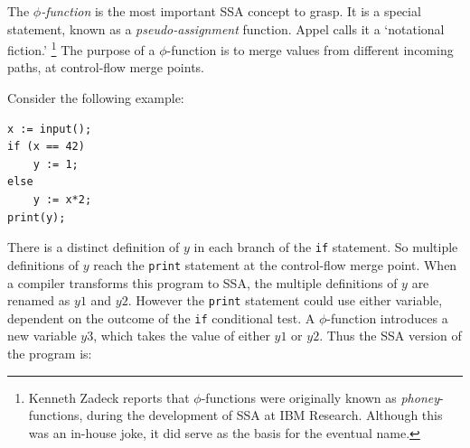 
The \textit{$\phi$-function} is the most important SSA concept to grasp.
It is a special statement, known as a
\textit{pseudo-assignment} function.
Appel \cite{appel97modern} calls it a `notational fiction.'
\footnote{
%
%
Kenneth Zadeck reports that $\phi$-functions were originally
known as \textit{phoney}-functions, during the development
of SSA at IBM Research. Although this was an in-house joke,
it did serve as the basis for the eventual name.
}
The purpose of a $\phi$-function is to merge
values from different incoming paths, at control-flow
merge points.

Consider the following example:

\begin{verbatim}
x := input();
if (x == 42)
    y := 1;
else
    y := x*2;
print(y);
\end{verbatim}

There is a distinct definition of $y$ in each branch of the \texttt{if}
statement. So multiple definitions of $y$ reach the \texttt{print} statement
at the control-flow merge point. When a compiler transforms this program 
to SSA,
the multiple definitions of $y$ are renamed as $y1$ and $y2$. However 
the \texttt{print} statement could use either variable, dependent on the
outcome of the \texttt{if} conditional test. A $\phi$-function introduces
a new variable $y3$, which takes the value of either $y1$ or $y2$.
Thus the SSA version of the program is:

